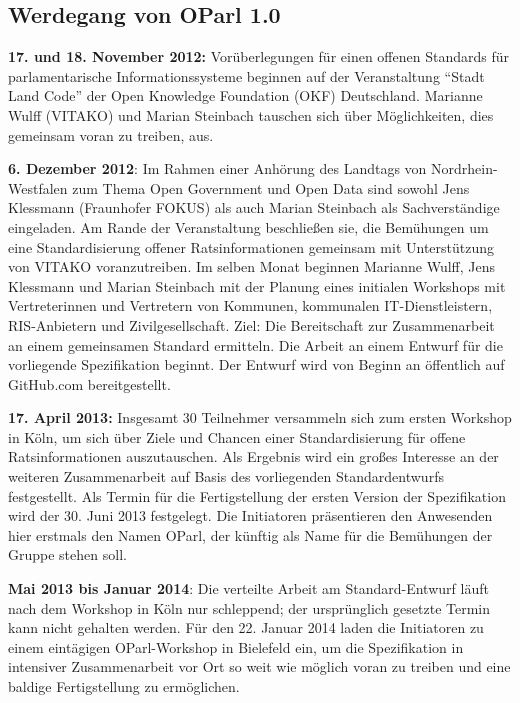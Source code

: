 \documentclass[,a4paper]{article}
\begin{document}
\subsection{Werdegang von OParl 1.0}\label{werdegang-von-oparl-1.0}

\textbf{17. und 18. November 2012:} Vorüberlegungen für einen offenen
Standards für parlamentarische Informationssysteme beginnen auf der
Veranstaltung ``Stadt Land Code'' der Open Knowledge Foundation (OKF)
Deutschland. Marianne Wulff (VITAKO) und Marian Steinbach tauschen sich
über Möglichkeiten, dies gemeinsam voran zu treiben, aus.

\textbf{6. Dezember 2012}: Im Rahmen einer Anhörung des Landtags von
Nordrhein-Westfalen zum Thema Open Government und Open Data sind sowohl
Jens Klessmann (Fraunhofer FOKUS) als auch Marian Steinbach als
Sachverständige eingeladen. Am Rande der Veranstaltung beschließen sie,
die Bemühungen um eine Standardisierung offener Ratsinformationen
gemeinsam mit Unterstützung von VITAKO voranzutreiben. Im selben Monat
beginnen Marianne Wulff, Jens Klessmann und Marian Steinbach mit der
Planung eines initialen Workshops mit Vertreterinnen und Vertretern von
Kommunen, kommunalen IT-Dienstleistern, RIS-Anbietern und
Zivilgesellschaft. Ziel: Die Bereitschaft zur Zusammenarbeit an einem
gemeinsamen Standard ermitteln. Die Arbeit an einem Entwurf für die
vorliegende Spezifikation beginnt. Der Entwurf wird von Beginn an
öffentlich auf GitHub.com bereitgestellt.

\textbf{17. April 2013:} Insgesamt 30 Teilnehmer versammeln sich zum
ersten Workshop in Köln, um sich über Ziele und Chancen einer
Standardisierung für offene Ratsinformationen auszutauschen. Als
Ergebnis wird ein großes Interesse an der weiteren Zusammenarbeit auf
Basis des vorliegenden Standardentwurfs festgestellt. Als Termin für die
Fertigstellung der ersten Version der Spezifikation wird der 30. Juni
2013 festgelegt. Die Initiatoren präsentieren den Anwesenden hier
erstmals den Namen OParl, der künftig als Name für die Bemühungen der
Gruppe stehen soll.

\textbf{Mai 2013 bis Januar 2014}: Die verteilte Arbeit am
Standard-Entwurf läuft nach dem Workshop in Köln nur schleppend; der
ursprünglich gesetzte Termin kann nicht gehalten werden. Für den 22.
Januar 2014 laden die Initiatoren zu einem eintägigen OParl-Workshop in
Bielefeld ein, um die Spezifikation in intensiver Zusammenarbeit vor Ort
so weit wie möglich voran zu treiben und eine baldige Fertigstellung zu
ermöglichen.
\end{document}
